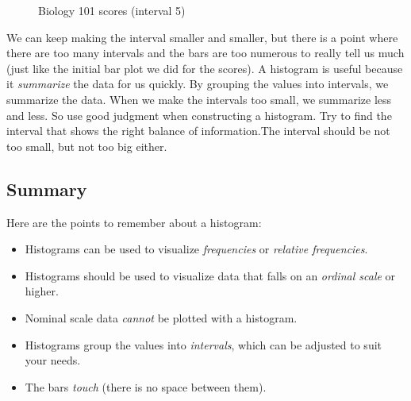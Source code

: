 \documentclass[../../../main.tex]{subfiles}
\begin{document}
\begin{figure}[ht]
  \caption{\label{plot:Biology 101 scores by 5s histogram} Biology 101 scores (interval 5)}
\end{figure}

We can keep making the interval smaller and smaller, but there is a point where there are too many intervals and the bars are too numerous to really tell us much (just like the initial bar plot we did for the scores). A histogram is useful because it \emph{summarize} the data for us quickly. By grouping the values into intervals, we summarize the data. When we make the intervals too small, we summarize less and less. So use good judgment when constructing a histogram. Try to find the interval that shows the right balance of information.The interval should be not too small, but not too big either.


\subsection{Summary}

Here are the points to remember about a histogram:

\begin{itemize}
  
  \item Histograms can be used to visualize \emph{frequencies} or \emph{relative frequencies}.
  
  \item Histograms should be used to visualize data that falls on an \emph{ordinal scale} or higher. 
  
  \item Nominal scale data \emph{cannot} be plotted with a histogram. 
  
  \item Histograms group the values into \emph{intervals}, which can be adjusted to suit your needs.
  
  \item The bars \emph{touch} (there is no space between them).

\end{itemize}
\end{document}
